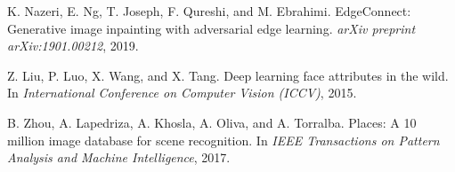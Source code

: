 \documentclass[10pt,twocolumn,letterpaper]{article}
\begin{document}
{\begin{thebibliography}{99}
K. Nazeri, E. Ng, T. Joseph, F. Qureshi, and M. Ebrahimi.
EdgeConnect: Generative image inpainting with adversarial edge learning.
\textit{arXiv preprint arXiv:1901.00212}, 2019.

Z. Liu, P. Luo, X. Wang, and X. Tang.
Deep learning face attributes in the wild.
In \textit{International Conference on Computer Vision (ICCV)}, 2015.

B. Zhou, A. Lapedriza, A. Khosla, A. Oliva, and A. Torralba.
Places: A 10 million image database for scene recognition.
In \textit{IEEE Transactions on Pattern Analysis and Machine Intelligence}, 2017.

\end{thebibliography}
}
\end{document}
